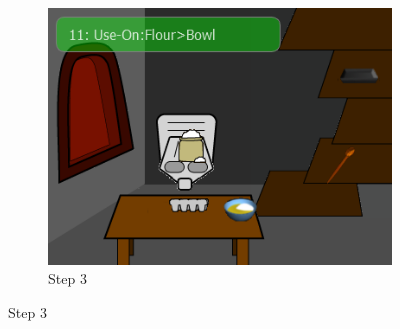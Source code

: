 \begin{figure}[ht]
\begin{subfigure}[b]{0.325\textwidth}
		\includegraphics[width=\textwidth]{step3.png}
		\caption{Step 3}
		\label{fig:control_ingredients}
	\end{subfigure}
	

\end{figure}
